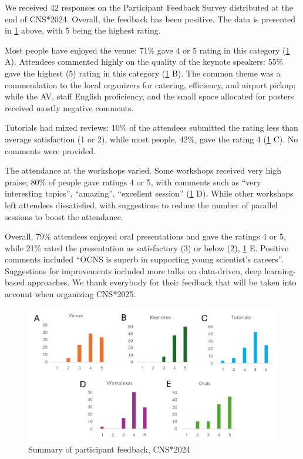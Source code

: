 \documentclass[11pt,a4paper,oneside]{article}
\begin{document}
We received 42 responses on the Participant Feedback Survey distributed at the end of CNS*2024.
Overall, the feedback has been positive. The data is presented in \cref{fig:cns2024-summary} above, with 5 being the highest rating.

Most people have enjoyed the venue: 71\% gave 4 or 5 rating in this category (\cref{fig:cns2024-summary} A).
Attendees commented highly on the quality of the keynote speakers: 55\% gave the highest (5) rating in this category (\cref{fig:cns2024-summary} B).
The common theme was a commendation to the local organizers for catering, efficiency, and airport pickup; while the AV, staff English proficiency, and the small space allocated for posters received mostly negative comments.

Tutorials had mixed reviews: 10\% of the attendees submitted the rating less than average satisfaction (1 or 2), while most people, 42\%, gave the rating 4 (\cref{fig:cns2024-summary} C). No comments were provided.

The attendance at the workshops varied.
Some workshops received very high praise; 80\% of people gave ratings 4 or 5, with comments such as \enquote{very interesting topics}, \enquote{amazing}, \enquote{excellent session} (\cref{fig:cns2024-summary} D).
While other workshops left attendees dissatisfied, with suggestions to reduce the number of parallel sessions to boost the attendance.

Overall, 79\% attendees enjoyed oral presentations and gave the ratings 4 or 5, while 21\% rated the presentation as satisfactory (3) or below (2), \cref{fig:cns2024-summary} E.
Positive comments included \enquote{OCNS is superb in supporting young scientist's careers}.
Suggestions for improvements included more talks on data-driven, deep learning-based approaches.
We thank everybody for their feedback that will be taken into account when organizing CNS*2025.

\begin{figure}[!h]
  \centering
  \includegraphics[width=\textwidth]{images/cns2024-feedback-form-summary}
  \caption{Summary of participant feedback, CNS*2024}%
  \label{fig:cns2024-summary}
\end{figure}
\end{document}
